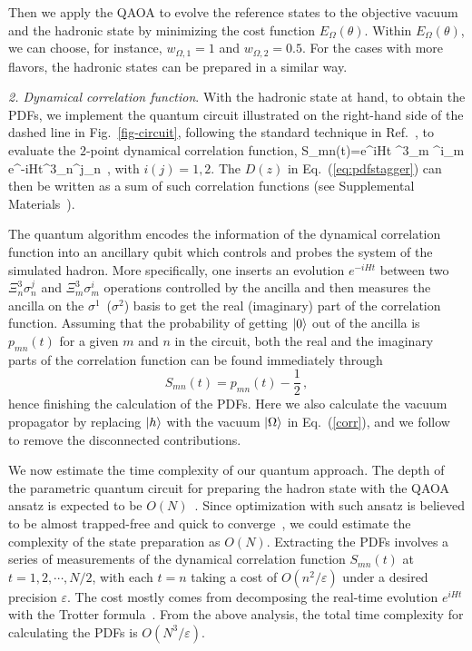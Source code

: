 \documentclass[aps,prl,twocolumn,superscriptaddress,notitlepage,nofootinbib]{revtex4-1}
\def\bea#1\eea{\begin{align}#1\end{align}}
\begin{document}
Then we apply the QAOA to evolve the reference states to the objective vacuum and the hadronic state by minimizing the cost function $E_\Omega(\theta)$. Within $E_\Omega(\theta)$, we can choose, for instance, $w_{\Omega,1} = 1$ and $w_{\Omega,2}= 0.5$. 
For the cases with more flavors, the hadronic states can be prepared in a similar way.

\textit{2. Dynamical correlation function}.
With the hadronic state at hand, to obtain the PDFs, we implement the quantum circuit illustrated on the right-hand side of the dashed line in Fig.~\ref{fig-circuit}, following the standard technique in Ref.~\cite{PhysRevLett.113.020505}, to evaluate the $2$-point dynamical correlation function, 
\bea\label{corr}
	S_{mn}(t)=e^{iHt}
	\Xi^3_m \sigma^i_m e^{-iHt}\Xi^3_n\sigma^j_n \,,
\eea
with $i(j) = 1,2$. 
The $D(z)$ in Eq.~(\ref{eq:pdfstagger}) can then be written as a sum of such correlation functions (see Supplemental Materials~\cite{supp}).

The quantum algorithm encodes the information of the dynamical correlation function into an ancillary qubit which controls and probes the system of the simulated hadron. More specifically, one inserts an evolution $e^{-i H t}$ between two $\Xi^3_n \sigma^j_n$ and $\Xi^3_m \sigma^i_m$ operations controlled by the ancilla and then measures the ancilla on the $\sigma^1$~($\sigma^2$) basis to get the real (imaginary) part of the correlation function. Assuming that the probability of getting $\ket{0}$ out of the ancilla is $p_{mn}(t)$ for a given $m$ and $n$ in the circuit, both the real and the imaginary parts of the correlation function can be found immediately through~\cite{PhysRevLett.113.020505}
\begin{equation}
  S_{mn}(t)=p_{mn}(t)-\frac{1}{2} \,,
\end{equation}
hence finishing the calculation of the PDFs. Here we also calculate the vacuum propagator by replacing $\ket{h}$ with the vacuum $\ket{\Omega}$ in Eq.~(\ref{corr}), and we follow~\cite{Collins:2011zzd,Jia:2018qee} to remove the disconnected contributions. 

We now estimate the time complexity of our quantum approach. The depth of the parametric quantum circuit for preparing the hadron state with the QAOA ansatz is expected to be $O(N)$~\cite{wiersema-PRXQuantum2020}. Since optimization with such ansatz is believed to be almost trapped-free and quick to converge~\cite{wiersema-PRXQuantum2020}, we could estimate the complexity of the state preparation as $O(N)$. Extracting the PDFs involves a series of measurements of the dynamical correlation function $S_{mn}(t)$ at $t=1,2,\cdots,N/2$, with each $t=n$ taking a cost of $O(n^2/\varepsilon)$ under a desired precision $\varepsilon$. The cost mostly comes from decomposing the real-time evolution $e^{iHt}$ with the Trotter formula~\cite{nielsen_chuang_2010}. From the above analysis, the total time complexity for calculating the PDFs is $O(N^3/\varepsilon)$.
\end{document}

